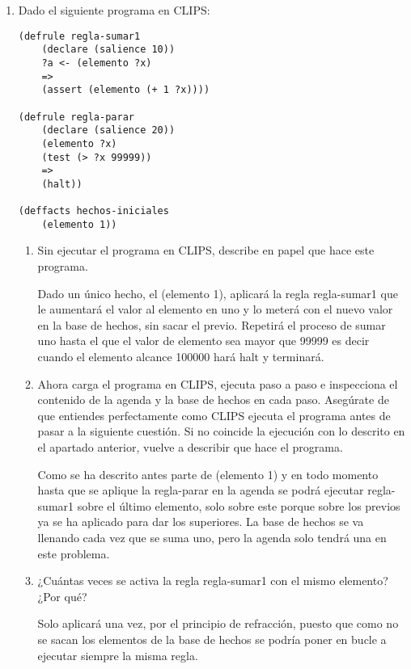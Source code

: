 \documentclass[12pt, spanish, pdftex]{UC3M_document}
\begin{document}
\begin{enumerate}
	\item Dado el siguiente programa en CLIPS:
	      \begin{lstlisting}
(defrule regla-sumar1
    (declare (salience 10))
    ?a <- (elemento ?x)
    =>
    (assert (elemento (+ 1 ?x))))

(defrule regla-parar
    (declare (salience 20))
    (elemento ?x)
    (test (> ?x 99999))
    =>
    (halt))
    
(deffacts hechos-iniciales
    (elemento 1))
\end{lstlisting}
	      \begin{enumerate}
		      \item Sin ejecutar el programa en CLIPS, describe en papel que hace este programa.

		            Dado un único hecho, el (elemento 1), aplicará la regla regla-sumar1 que le aumentará el valor al elemento en uno y lo meterá con el nuevo valor en la base de hechos, sin sacar el previo. Repetirá el proceso de sumar uno hasta el que el valor de elemento sea mayor que 99999 es decir cuando el elemento alcance 100000 hará halt y terminará.

		      \item Ahora carga el programa en CLIPS, ejecuta paso a paso e inspecciona el contenido de la agenda y la base de hechos en cada paso. Asegúrate de que entiendes perfectamente como CLIPS ejecuta el programa antes de pasar a la siguiente cuestión. Si no coincide la ejecución con lo descrito en el apartado anterior, vuelve a describir que hace el programa.

		            Como se ha descrito antes parte de (elemento 1) y en todo momento hasta que se aplique la regla-parar en la agenda se podrá ejecutar regla-sumar1 sobre el último elemento, solo sobre este porque sobre los previos ya se ha aplicado para dar los superiores. La base de hechos se va llenando cada vez que se suma uno, pero la agenda solo tendrá una en este problema.

		      \item ¿Cuántas veces se activa la regla regla-sumar1 con el mismo elemento? ¿Por qué?

		            Solo aplicará una vez, por el principio de refracción, puesto que como no se sacan los elementos de la base de hechos se podría poner en bucle a ejecutar siempre la misma regla.

	      \end{enumerate}
	      \pagebreak


\end{enumerate}
\end{document}
